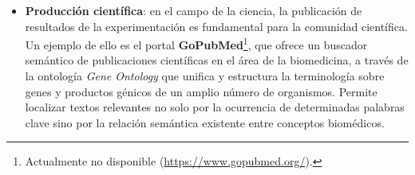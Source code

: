 \begin{itemize}
	\item %
	\textbf{Producción científica}: en el campo de la ciencia, la publicación de resultados de la experimentación es fundamental para la comunidad científica. Un ejemplo de ello es el portal \textbf{GoPubMed}\footnote{Actualmente no disponible (\url{https://www.gopubmed.org/}).}, que ofrece un buscador semántico de publicaciones científicas en el área de la biomedicina, a través de la ontología \textit{Gene Ontology} que unifica y estructura la terminología sobre genes y productos génicos de un amplio número de organismos. Permite localizar textos relevantes no solo por la ocurrencia de determinadas palabras clave sino por la relación semántica existente entre conceptos biomédicos. 
 
	
	

\end{itemize}
